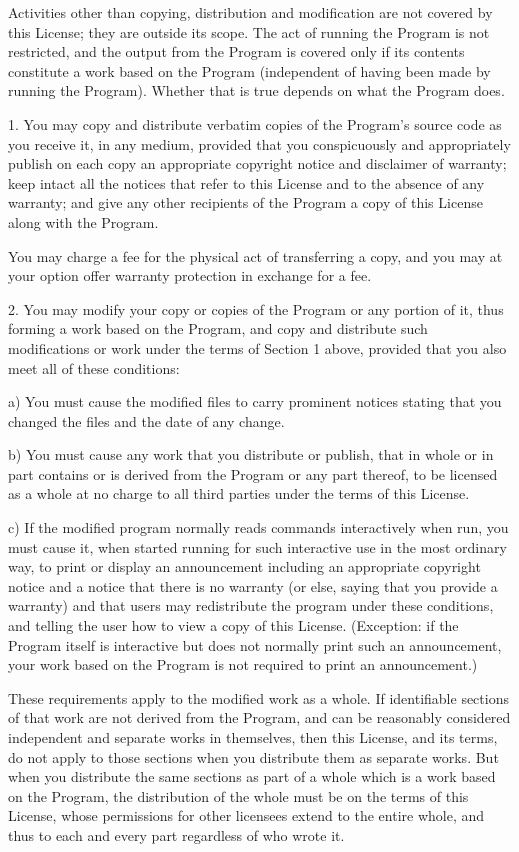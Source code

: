 Activities other than copying, distribution and modification are not
covered by this License; they are outside its scope.  The act of
running the Program is not restricted, and the output from the Program
is covered only if its contents constitute a work based on the
Program (independent of having been made by running the Program).
Whether that is true depends on what the Program does.

1. You may copy and distribute verbatim copies of the Program's
source code as you receive it, in any medium, provided that you
conspicuously and appropriately publish on each copy an appropriate
copyright notice and disclaimer of warranty; keep intact all the
notices that refer to this License and to the absence of any warranty;
and give any other recipients of the Program a copy of this License
along with the Program.

You may charge a fee for the physical act of transferring a copy, and
you may at your option offer warranty protection in exchange for a fee.

2. You may modify your copy or copies of the Program or any portion
of it, thus forming a work based on the Program, and copy and
distribute such modifications or work under the terms of Section 1
above, provided that you also meet all of these conditions:

a) You must cause the modified files to carry prominent notices
stating that you changed the files and the date of any change.

b) You must cause any work that you distribute or publish, that in
whole or in part contains or is derived from the Program or any
part thereof, to be licensed as a whole at no charge to all third
parties under the terms of this License.

c) If the modified program normally reads commands interactively
when run, you must cause it, when started running for such
interactive use in the most ordinary way, to print or display an
announcement including an appropriate copyright notice and a
notice that there is no warranty (or else, saying that you provide
a warranty) and that users may redistribute the program under
these conditions, and telling the user how to view a copy of this
License.  (Exception: if the Program itself is interactive but
does not normally print such an announcement, your work based on
the Program is not required to print an announcement.)

These requirements apply to the modified work as a whole.  If
identifiable sections of that work are not derived from the Program,
and can be reasonably considered independent and separate works in
themselves, then this License, and its terms, do not apply to those
sections when you distribute them as separate works.  But when you
distribute the same sections as part of a whole which is a work based
on the Program, the distribution of the whole must be on the terms of
this License, whose permissions for other licensees extend to the
entire whole, and thus to each and every part regardless of who wrote it.

